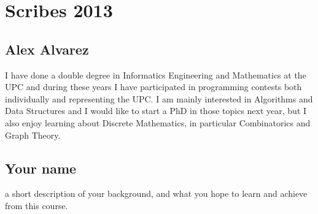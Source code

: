 \chapter*{Scribes 2013}

\section{Alex Alvarez}
I have done a double degree in Informatics Engineering and Mathematics at the UPC and during these years I have participated in programming contests both individually and representing the UPC. I am mainly interested in Algorithms and Data Structures and I would like to start a PhD in those topics next year, but I also enjoy learning about Discrete Mathematics, in particular Combinatorics and Graph Theory.

\section{Your name}

a short description of your background, and what you hope to learn and
achieve from this course.



